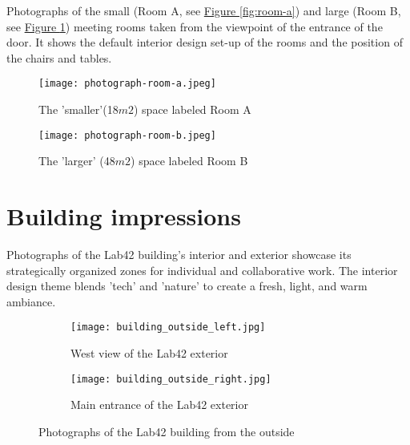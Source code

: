 \begin{appendices}
Photographs of the small (Room A, see \hyperref[fig:room-a]{Figure \ref{fig:room-a}}) and large (Room B, see \hyperref[fig:room-b]{Figure \ref{fig:room-b}}) meeting rooms taken from the viewpoint of the entrance of the door. It shows the default interior design set-up of the rooms and the position of the chairs and tables.

\begin{figure}[H]
\begin{minipage}{.5\textwidth}
    \centering
    \texttt{[image: photograph-room-a.jpeg]}
    \caption{The 'smaller'(18$m2$) space labeled Room A}
    \label{fig:room-a}
\end{minipage}%
\begin{minipage}{.5\textwidth}
    \centering
    \texttt{[image: photograph-room-b.jpeg]}
    \caption{The 'larger' (48$m2$) space labeled Room B}
    \label{fig:room-b}
\end{minipage}%
\end{figure}

\section{Building impressions}
\label{appendix:building}

Photographs of the Lab42 building's interior and exterior showcase its strategically organized zones for individual and collaborative work. The interior design theme blends 'tech' and 'nature' to create a fresh, light, and warm ambiance.

\begin{figure}[htbp]
    \centering
    \begin{subfigure}{0.48\textwidth}
        \centering
        \texttt{[image: building\_outside\_left.jpg]}
        \caption{West view of the Lab42 exterior}
        \label{fig:outside-left}
    \end{subfigure}
    \hfill
    \begin{subfigure}{0.48\textwidth}
        \centering
        \texttt{[image: building\_outside\_right.jpg]}
        \caption{Main entrance of the Lab42 exterior}
        \label{fig:outside-right}
    \end{subfigure}
    \caption{Photographs of the Lab42 building from the outside}
    \label{fig:building-outside}
\end{figure}


\end{appendices}
